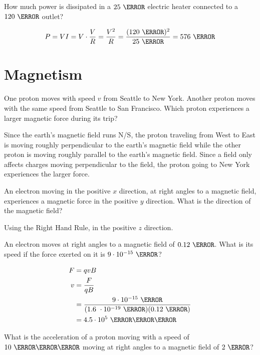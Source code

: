 \documentclass[fleqn,addpoints]{exam}
\begin{document}
\begin{questions}
\question[5]
How much power is dissipated in a $25 \ \ohm$ electric heater connected to a $120 \ \volt$ outlet?
\begin{solution}
\[
  P = VI = V \cdot \frac{V}{R} = \frac{V^2}{R} = \frac{(120 \ \volt)^2}{25 \ \ohm} = 576 \ \watt
\]
\end{solution}

\section{Magnetism}
\question[5]
One proton moves with speed $v$ from Seattle to New York.  Another proton moves with the same speed from Seattle to San
Francisco.  Which proton experiences a larger magnetic force during its trip?

\begin{solution}
Since the earth's magnetic field runs N/S, the proton traveling from West to East is moving roughly perpendicular to the
earth's magnetic field while the other proton is moving roughly parallel to the earth's magnetic field.  Since a field
only affects charges moving perpendicular to the field, the proton going to New York experiences the larger force.
\end{solution}

\question[5]
An electron moving in the positive $x$ direction, at right angles to a magnetic field, experiences a magnetic force in
the positive $y$ direction.  What is the direction of the magnetic field?
\begin{solution}
Using the Right Hand Rule, in the positive $z$ direction.
\end{solution}

\question[5]
An electron moves at right angles to a magnetic field of $0.12 \ \tesla$.  What is its speed if the force exerted on it
is $9 \cdot 10^{-15} \ \newton$?
\begin{solution}

\begin{align*}
  F &= qvB \\
  v &= \frac{F}{qB} \\
    &= \frac{9 \cdot 10^{-15} \ \newton}{(1.6 \ \cdot 10^{-19} \ \coulomb)(0.12 \ \tesla)} \\
    &= 4.5 \cdot 10^5 \ \meter \per \second \\
\end{align*}

\end{solution}

\question[5]
What is the acceleration of a proton moving with a speed of $10 \ \meter \per \second$ moving at right angles to a
magnetic field of $2 \ \tesla$?
\begin{solution}


\end{solution}
\end{questions}
\end{document}
